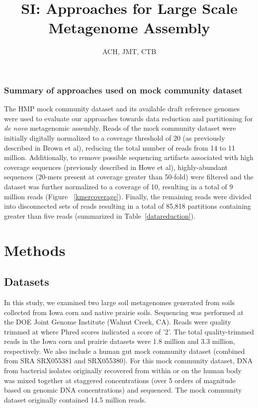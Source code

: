 \documentclass[11pt]{article} %
\begin{document}
\title{SI:  Approaches for Large Scale Metagenome Assembly}
\author{ACH, JMT, CTB}
\maketitle

\subsubsection{Summary of approaches used on mock community dataset}

The HMP mock community dataset and its available draft reference genomes were used to evaluate our approaches towards data reduction and partitioning for \emph{de novo} metagenomic assembly.   Reads of the mock community dataset were initially digitally normalized to a coverage threshold of 20 (as previously described in Brown et al), reducing the total number of reads from 14 to 11 million.  Additionally, to remove possible sequencing artifacts associated with high coverage sequences (previously described in Howe et al), highly-abundant sequences (20-mers present at coverage greater than 50-fold) were filtered and the dataset was further normalized to a coverage of 10, resulting in a total of 9 million reads (Figure ~\ref{kmercoverage}).  Finally, the remaining reads were divided into disconnected sets of reads resulting in a total of 85,818 partitions containing greater than five reads (summarized in Table~\ref{datareduction}).

\section{Methods}

\subsection{Datasets}
In this study, we examined two large soil metagenomes generated from soils collected from Iowa corn and native prairie soils.  Sequencing was performed at the DOE Joint Genome Institute (Walnut Creek, CA).   Reads were quality trimmed at where Phred scores indicated a score of '2'.  The total quality-trimmed reads in the Iowa corn and prairie datasets were 1.8 million and 3.3 million, respectively.  We also include a human gut mock community dataset (combined from SRA SRX055381 and SRX055380).  For this mock community dataset, DNA from bacterial isolates originally recovered from within or on the human body was mixed together at staggered concentrations (over 5 orders of magnitude based on genomic DNA concentrations) and sequenced.  The mock community dataset originally contained 14.5 million reads.  
\end{document}
